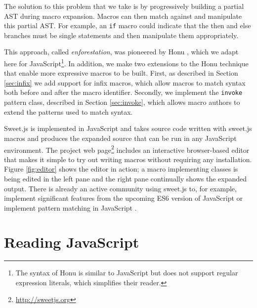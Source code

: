 \documentclass[9pt]{sigplanconf}
\begin{document}
The solution to this problem that we take is by progressively building
a partial AST during macro expansion. Macros can then match against
and manipulate this partial AST. For example, an \verb!if! macro
could indicate that the then and else branches must be single
statements and then manipulate them appropriately.


This approach, called \emph{enforestation}, was pioneered by Honu
\cite{Rafkind2012,Rafkind2013}, which we adapt here for
JavaScript\footnote{The syntax of Honu is similar to JavaScript but does
  not support regular expression literals, which simplifies their
  reader. }. In addition, we make two extensions to the Honu technique
that enable more expressive macros to be built. First, as described in
Section \ref{sec:infix} we add support for infix macros, which allow
macros to match syntax both before and after the macro identifier.
Secondly, we implement the \verb!invoke! pattern class, described in
Section \ref{sec:invoke}, which allows macro authors to extend the
patterns used to match syntax.

Sweet.js is implemented in JavaScript and takes source code written with sweet.js macros and produces the expanded source that can be run in any JavaScript environment. 
The project web page\footnote{\url{http://sweetjs.org}} includes an interactive browser-based editor that makes it simple to try out writing macros without requiring any installation.
Figure \ref{fig:editor} shows the editor in action; a macro implementing classes is being edited in the left pane and the right pane continually shows the expanded output.
There is already an active community using sweet.js to, for example, implement
significant features from the upcoming ES6 version of JavaScript \cite{Long} or implement pattern matching in JavaScript \cite{Faubion}.




\section{Reading JavaScript}
\label{sec:read}
\end{document}
